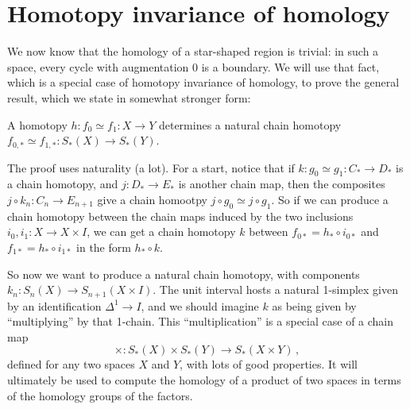 \section{Homotopy invariance of homology}
We now know that the homology of a star-shaped region is trivial: in such a space, every cycle with augmentation 0 is a boundary. We will use that fact, which is a special case of homotopy invariance of homology, to prove the general result, which we state in somewhat stronger form:
	\begin{theorem}
A homotopy $h:f_0\simeq f_1:X\to Y$ determines a natural chain homotopy
$f_{0,\ast}\simeq f_{1,\ast}:S_\ast(X)\to S_\ast(Y)$.
	\end{theorem}

The proof uses naturality (a lot). For a start, notice that if $k:g_0\simeq g_1:C_*\to D_*$ is a chain homotopy, and $j:D_*\to E_*$ is another chain map, then the composites $j\circ k_n:C_n\to E_{n+1}$ give a chain homootpy $j\circ g_0\simeq j\circ g_1$. So if we can produce a chain homotopy between the chain maps induced by the two inclusions $i_0,i_1:X\to X\times I$, we can get a chain homotopy $k$ between $f_{0*}=h_*\circ i_{0*}$ and 
$f_{1*}=h_*\circ i_{1*}$ in the form $h_*\circ k$. 

So now we want to produce a natural chain homotopy, with components 
$k_n:S_n(X)\to S_{n+1}(X\times I)$. The unit interval hosts a natural 1-simplex
given by an identification $\Delta^1\to I$, and we should imagine $k$ as being
given by ``multiplying'' by that 1-chain. This ``multiplication'' is a special
case of a chain map 
\[
\times:S_*(X)\times S_*(Y)\to S_*(X\times Y)\,,
\]
defined for any two spaces $X$ and $Y$, 
with lots of good properties. It will ultimately be used to compute the homology of a product of two spaces in terms of the homology groups of the factors. 

